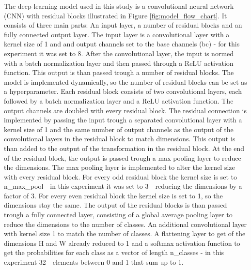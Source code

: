 The deep learning model used in this study is a convolutional neural network (CNN) with residual blocks
illustrated in Figure \ref{fig:model_flow_chart}. It consists of three main parts: An input layer,
a number of residual blocks and an fully connected output layer. The input layer is a convolutional layer with a kernel
size of 1 and and output channels set to the base channels (bc) - for this experiment it was set to 8.
After the convolutional layer, the input is normed with a batch normalization layer and then passed through
a ReLU activation function. This output is than passed trough a number of residual blocks. The model is
implemented dynamically, so the number of residual blocks can be set as a hyperparameter. Each residual block
consists of two convolutional layers, each followed by a batch normalization layer and a ReLU activation function.
The output channels are doubled with every residual block.
The residual connection is implemented by passing the input trough a separated convolutional layer with a kernel size of 1
and the same number of output channels as the output of the convolutional layers in the residual block to
match dimensions. This output is than added to the output of the transformation in the residual block.
At the end of the residual block, the output is passed trough a max pooling layer to reduce the dimensions.
The max pooling layer is implemented to alter the kernel size with every residual block. For every odd residual block
the kernel size is set to n\_max\_pool - in this experiment it was set to 3 - reducing the dimensions by a factor of 3.
For every even residual block the kernel size is set to 1, so the dimensions stay the same. The output of the residual blocks
is than passed trough a fully connected layer, consisting of a 
global average pooling layer to reduce the dimensions to the number of classes. An additional
convolutional layer with kernel size 1 to match the number of classes. A flattening layer to get of the dimensions H and W
already reduced to 1 and a softmax activation function to get the probabilities for each class as a vector of length n\_classes
- in this experiment 32 - elements between 0 and 1 that sum up to 1.

